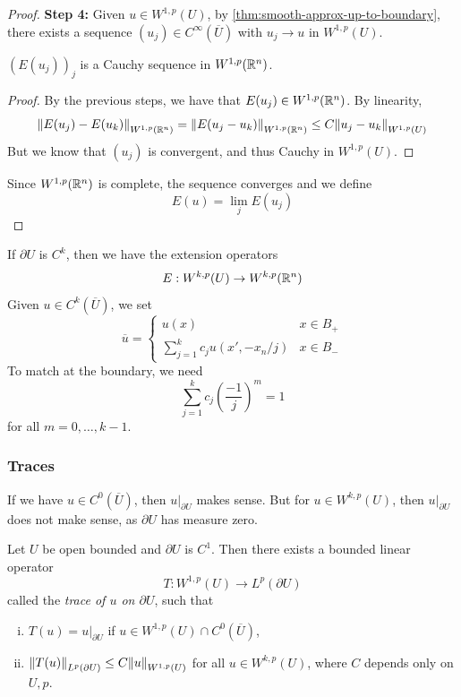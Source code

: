 \documentclass{article}
\begin{document}
\begin{proof}
    \textbf{Step 4:} Given \(u \in W^{1, p}(U)\), by \cref{thm:smooth-approx-up-to-boundary}, there exists a sequence \((u_j) \in C^\infty(\overline U)\) with \(u_j \to u\) in \(W^{1,p}(U)\).

    \begin{claim}
        \((E(u_j))_j\) is a Cauchy sequence in \(W^{1, p}(\mathbb{R}^n)\).
    \end{claim}

    \begin{proof}
        By the previous steps, we have that \(E(u_j) \in W^{1, p}(\mathbb{R}^n)\). By linearity,
        \[\norm{E(u_j) - E(u_k)}_{W^{1, p}(\mathbb{R}^n)} = \norm{E(u_j - u_k)}_{W^{1, p}(\mathbb{R}^n)} \le C\norm{u_j - u_k}_{W^{1, p}(U)}\]
        But we know that \((u_j)\) is convergent, and thus Cauchy in \(W^{1, p}(U)\).
    \end{proof}
    Since \(W^{1, p}(\mathbb{R}^n)\) is complete, the sequence converges and we define
    \[E(u) = \lim_j E(u_j)\]
\end{proof}

\begin{remark}
    If \(\partial U\) is \(C^k\), then we have the extension operators
    \[E : W^{k, p}(U) \to W^{k, p}(\mathbb{R}^n)\]
    Given \(u \in C^k(\overline U)\), we set
    \[\overline{u} = \begin{cases}
        u(x) & x\in B_+ \\
        \sum_{j=1}^k c_ju(x', -x_n/j) & x \in B_-
    \end{cases}\] 
    To match at the boundary, we need
    \[\sum_{j=1}^kc_j\left(\frac{-1}{j}\right)^m = 1\]
    for all \(m = 0, \dots, k-1\).
\end{remark}

\lec

\subsubsection*{Traces}

If we have \(u \in C^0(\overline U)\), then \(u \vert_{\partial U}\) makes sense. But for \(u \in W^{k, p}(U)\), then \(u\vert_{\partial U}\) does not make sense, as \(\partial U\) has measure zero.

\begin{theorem}
    Let \(U\) be open bounded and \(\partial U\) is \(C^1\). Then there exists a bounded linear operator
    \[T : W^{1, p}(U) \to L^p(\partial U)\]
    called the \emph{trace of \(u\) on \(\partial U\)}, such that
    \begin{enumerate}[(i)]
        \item \(T(u) = u\vert_{\partial U}\) if \(u \in W^{1, p}(U) \cap C^0(\overline U)\),
        \item \(\norm{T(u)}_{L^p(\partial U)} \le C \norm{u}_{W^{1, p}(U)}\) for all \(u \in W^{k, p}(U)\), where \(C\) depends only on \(U, p\).
    \end{enumerate}
\end{theorem}
\end{document}
